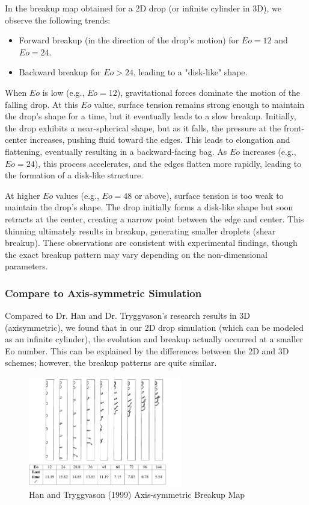 \documentclass[12pt]{article}
\begin{document}
In the breakup map obtained for a 2D drop (or infinite cylinder in 3D), we observe the following trends:

\begin{itemize}
    \item Forward breakup (in the direction of the drop's motion) for $Eo = 12$ and $Eo = 24$.
    \item Backward breakup for $Eo > 24$, leading to a "disk-like" shape.
\end{itemize}

When $Eo$ is low (e.g., $Eo = 12$), gravitational forces dominate the motion of the falling drop. At this $Eo$ value, surface tension remains strong enough to maintain the drop's shape for a time, but it eventually leads to a slow breakup. Initially, the drop exhibits a near-spherical shape, but as it falls, the pressure at the front-center increases, pushing fluid toward the edges. This leads to elongation and flattening, eventually resulting in a backward-facing bag. As $Eo$ increases (e.g., $Eo = 24$), this process accelerates, and the edges flatten more rapidly, leading to the formation of a disk-like structure.

At higher $Eo$ values (e.g., $Eo = 48$ or above), surface tension is too weak to maintain the drop's shape. The drop initially forms a disk-like shape but soon retracts at the center, creating a narrow point between the edge and center. This thinning ultimately results in breakup, generating smaller droplets (shear breakup). These observations are consistent with experimental findings, though the exact breakup pattern may vary depending on the non-dimensional parameters.
\subsubsection{Compare to Axis-symmetric Simulation}



Compared to Dr. Han and Dr. Tryggvason's research results in 3D (axisymmetric), we found that in our 2D drop simulation (which can be modeled as an infinite cylinder), the evolution and breakup actually occurred at a smaller Eo number. This can be explained by the differences between the 2D and 3D schemes; however, the breakup patterns are quite similar.


\begin{figure}[H]
    \centering
    \includegraphics[width=0.6\textwidth]{Latex/figures/Trygg_allEo.jpg}
    \caption{Han and Tryggvason (1999) Axis-symmetric Breakup Map\cite{han1999axisymmetric}}
    \label{fig:deformation}
\end{figure}
\end{document}
